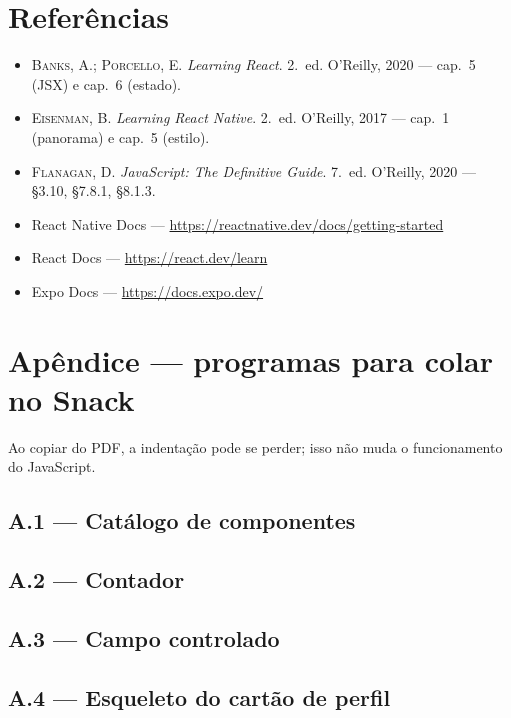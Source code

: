 \documentclass[11pt,a4paper]{article}
\begin{document}
\section*{Referências}
{\small
\begin{itemize}
  \item \textsc{Banks}, A.; \textsc{Porcello}, E. \emph{Learning React}. 2.~ed. O'Reilly, 2020 --- cap.~5 (JSX) e cap.~6 (estado).
  \item \textsc{Eisenman}, B. \emph{Learning React Native}. 2.~ed. O'Reilly, 2017 --- cap.~1 (panorama) e cap.~5 (estilo).
  \item \textsc{Flanagan}, D. \emph{JavaScript: The Definitive Guide}. 7.~ed. O'Reilly, 2020 --- §3.10, §7.8.1, §8.1.3.
  \item React Native Docs --- \url{https://reactnative.dev/docs/getting-started}
  \item React Docs --- \url{https://react.dev/learn}
  \item Expo Docs --- \url{https://docs.expo.dev/}
\end{itemize}
}

\clearpage
\section*{Apêndice --- programas para colar no Snack}\label{apx:codigos}
Ao copiar do PDF, a indentação pode se perder; isso não muda o funcionamento do JavaScript.

\subsection*{A.1 --- Catálogo de componentes}


\subsection*{A.2 --- Contador}


\subsection*{A.3 --- Campo controlado}


\clearpage
\subsection*{A.4 --- Esqueleto do cartão de perfil}

\end{document}
